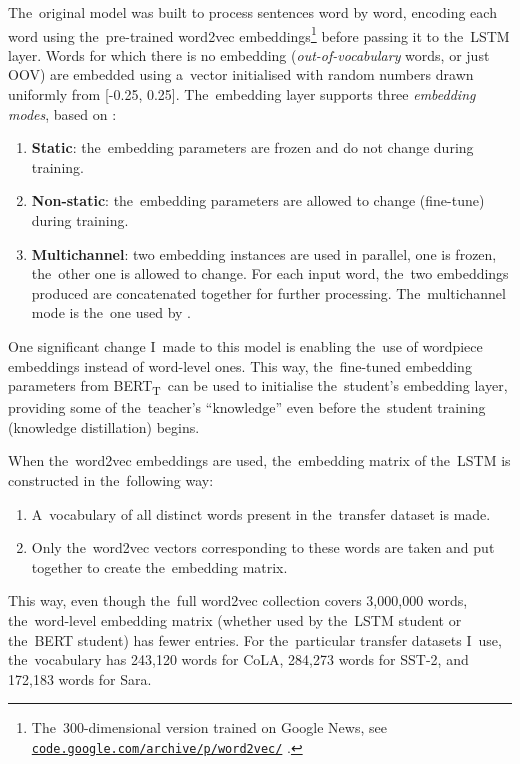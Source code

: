 \documentclass[bsc,frontabs,singlespacing,parskip,deptreport]{infthesis}
\def\BERTT{BERT\textsubscript{T}}
\newcommand\rurl[1]{%
  \href{https://#1}{\nolinkurl{#1}}%
}
\begin{document}
{{{      The~original model was built to process sentences word by word, encoding each word using the~pre-trained word2vec embeddings\footnote{The~300-dimensional version trained on Google News, see \rurl{code.google.com/archive/p/word2vec/}.} before passing it to the~LSTM layer. Words for which there is no embedding (\textit{out-of-vocabulary} words, or just OOV) are embedded using a~vector initialised with random numbers drawn uniformly from [-0.25, 0.25]. The~embedding layer supports three \textit{embedding modes}, based on \citet{Kim_2014}:
      \begin{enumerate}
        \item \textbf{Static}: the~embedding parameters are frozen and do not change during training.
        \item \textbf{Non-static}: the~embedding parameters are allowed to change (fine-tune) during training.
        \item \textbf{Multichannel}: two embedding instances are used in parallel, one is frozen, the~other one is allowed to change. For each input word, the~two embeddings produced are concatenated together for further processing. The~multichannel mode is the~one used by \citeauthor{Tang_2019b}.
      \end{enumerate}

      One significant change I~made to this model is enabling the~use of wordpiece embeddings instead of word-level ones. This way, the~fine-tuned embedding parameters from \BERTT~can be used to initialise the~student's embedding layer, providing some of the~teacher's ``knowledge'' even before the~student training (knowledge distillation) begins.

      When the~word2vec embeddings are used, the~embedding matrix of the~LSTM is constructed in the~following way:
      \begin{enumerate}
        \item A~vocabulary of all distinct words present in the~transfer dataset is made.
        \item Only the~word2vec vectors corresponding to these words are taken and put together to create the~embedding matrix.
      \end{enumerate}
      This way, even though the~full word2vec collection covers 3,000,000 words, the~word-level embedding matrix (whether used by the~LSTM student or the~BERT student) has fewer entries. For the~particular transfer datasets I~use, the~vocabulary has 243,120 words for CoLA, 284,273 words for SST-2, and 172,183 words for Sara.

}}}
\end{document}
